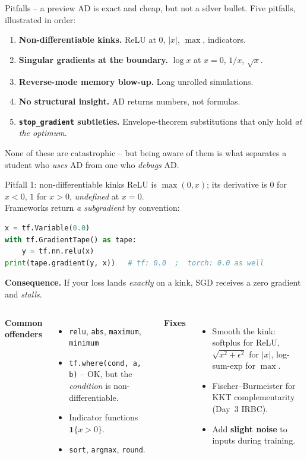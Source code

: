 \documentclass[aspectratio=169,11pt]{beamer}
\newcommand{\emphc}[1]{\textcolor{harvardcrimson}{#1}}
\begin{document}
\begin{frame}{Pitfalls -- a preview}
\small AD is exact and cheap, but not a silver bullet. Five pitfalls, illustrated in order:
\begin{enumerate}\itemsep3pt
\item \textbf{Non-differentiable kinks.} ReLU at 0, $|x|$, $\max$, indicators.
\item \textbf{Singular gradients at the boundary.} $\log x$ at $x=0$, $1/x$, $\sqrt{x}$.
\item \textbf{Reverse-mode memory blow-up.} Long unrolled simulations.
\item \textbf{No structural insight.} AD returns numbers, not formulas.
\item \textbf{\texttt{stop\_gradient} subtleties.} Envelope-theorem substitutions that only hold \emph{at the optimum}.
\end{enumerate}
\vspace{6pt}
\emphc{None of these are catastrophic} -- but being aware of them is what separates a student who \emph{uses} AD from one who \emph{debugs} AD.
\end{frame}

\begin{frame}[fragile]{Pitfall 1: non-differentiable kinks}
\small ReLU is $\max(0,x)$; its derivative is $0$ for $x<0$, $1$ for $x>0$, \emph{undefined} at $x=0$.\\ Frameworks return \emph{a subgradient} by convention:
\begin{lstlisting}[language=Python,basicstyle=\ttfamily\scriptsize]
x = tf.Variable(0.0)
with tf.GradientTape() as tape:
    y = tf.nn.relu(x)
print(tape.gradient(y, x))   # tf: 0.0  ;  torch: 0.0 as well
\end{lstlisting}
\textbf{Consequence.} If your loss lands \emph{exactly} on a kink, SGD receives a zero gradient and \emph{stalls}.
\vspace{4pt}
\begin{columns}
\textbf{Common offenders}
\begin{itemize}\itemsep2pt
\item \texttt{relu}, \texttt{abs}, \texttt{maximum}, \texttt{minimum}
\item \texttt{tf.where(cond, a, b)} -- OK, but the \emph{condition} is non-differentiable.
\item Indicator functions $\mathbf{1}\{x > 0\}$.
\item \texttt{sort}, \texttt{argmax}, \texttt{round}.
\end{itemize}
\textbf{Fixes}
\begin{itemize}\itemsep2pt
\item \emphc{Smooth the kink:} softplus for ReLU, $\sqrt{x^2 + \epsilon^2}$ for $|x|$, log-sum-exp for $\max$.
\item \emphc{Fischer--Burmeister} for KKT complementarity (Day~3 IRBC).
\item Add \textbf{slight noise} to inputs during training.
\end{itemize}
\end{columns}
\end{frame}
\end{document}
